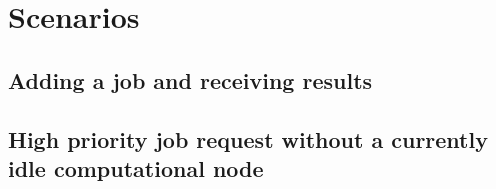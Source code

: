 \section{Scenarios}
\subsection{Adding a job and receiving results}
\subsection{High priority job request without a currently idle computational node}